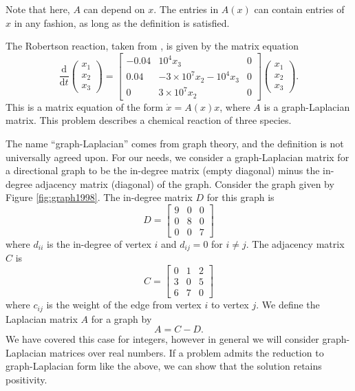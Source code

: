 Note that here, $A$ can depend on $x$. The entries in $A(x)$ can contain entries of $x$ in any fashion, as long as the definition is satisfied.

\begin{example}
    The Robertson reaction, taken from \cite{blanes_pos_2022}, is given by the matrix equation
    \begin{equation*}
        \frac{\mathrm{d}}{\mathrm{d}t}\begin{pmatrix}
            x_1 \\
            x_2 \\
            x_3
        \end{pmatrix} = \begin{bmatrix}
            -0.04 & 10^4 x_3 & 0 \\
            0.04 & -3\times 10^7 x_2 - 10^4 x_3 & 0 \\
            0 & 3 \times 10^7 x_2 & 0
        \end{bmatrix} \begin{pmatrix}
            x_1 \\
            x_2 \\
            x_3
        \end{pmatrix}.
    \end{equation*}
    This is a matrix equation of the form $\dot{x} = A(x)x$, where $A$ is a graph-Laplacian matrix.
    This problem describes a chemical reaction of three species.
\end{example}

The name ``graph-Laplacian'' comes from graph theory, and the definition is not universally agreed upon.
For our needs, we consider a graph-Laplacian matrix for a directional graph to be the in-degree matrix (empty diagonal) minus the in-degree adjacency matrix (diagonal) of the graph.
Consider the graph given by Figure \ref{fig:graph1998}.
The in-degree matrix $D$ for this graph is
\begin{equation*}
    D = \begin{bmatrix}
        9 & 0 & 0 \\
        0 & 8 & 0 \\
        0 & 0 & 7
    \end{bmatrix}
\end{equation*}
where $d_{ii}$ is the in-degree of vertex $i$ and $d_{ij}=0$ for $i \neq j$. 
The adjacency matrix $C$ is
\begin{equation*}
    C = \begin{bmatrix}
        0 & 1 & 2 \\
        3 & 0 & 5 \\
        6 & 7 & 0
    \end{bmatrix}
\end{equation*}
where $c_{ij}$ is the weight of the edge from vertex $i$ to vertex $j$.
We define the Laplacian matrix $A$ for a graph by
\begin{equation}
    A = C - D.
\end{equation}
We have covered this case for integers, however in general we will consider graph-Laplacian matrices over real numbers.
If a problem admits the reduction to graph-Laplacian form like the above,
we can show that the solution retains positivity.

